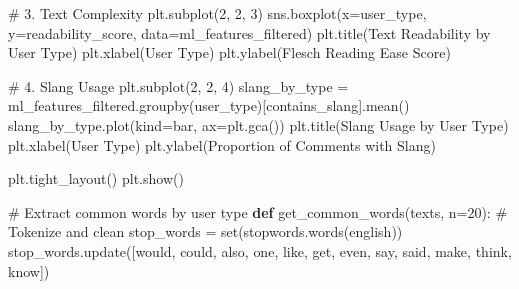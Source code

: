 \documentclass[
  12pt,
  letterpaper,
  DIV=11,
  numbers=noendperiod]{scrartcl}
\newenvironment{Shaded}{\begin{snugshade}}{\end{snugshade}}
\newcommand{\BuiltInTok}[1]{\textcolor[rgb]{0.00,0.23,0.31}{#1}}
\newcommand{\CommentTok}[1]{\textcolor[rgb]{0.37,0.37,0.37}{#1}}
\newcommand{\DecValTok}[1]{\textcolor[rgb]{0.68,0.00,0.00}{#1}}
\newcommand{\KeywordTok}[1]{\textcolor[rgb]{0.00,0.23,0.31}{\textbf{#1}}}
\newcommand{\NormalTok}[1]{\textcolor[rgb]{0.00,0.23,0.31}{#1}}
\newcommand{\OperatorTok}[1]{\textcolor[rgb]{0.37,0.37,0.37}{#1}}
\newcommand{\StringTok}[1]{\textcolor[rgb]{0.13,0.47,0.30}{#1}}
\begin{document}
\begin{Shaded}
\begin{Highlighting}[]
\CommentTok{\# 3. Text Complexity}
\NormalTok{plt.subplot(}\DecValTok{2}\NormalTok{, }\DecValTok{2}\NormalTok{, }\DecValTok{3}\NormalTok{)}
\NormalTok{sns.boxplot(x}\OperatorTok{=}\StringTok{\textquotesingle{}user\_type\textquotesingle{}}\NormalTok{, y}\OperatorTok{=}\StringTok{\textquotesingle{}readability\_score\textquotesingle{}}\NormalTok{, data}\OperatorTok{=}\NormalTok{ml\_features\_filtered)}
\NormalTok{plt.title(}\StringTok{\textquotesingle{}Text Readability by User Type\textquotesingle{}}\NormalTok{)}
\NormalTok{plt.xlabel(}\StringTok{\textquotesingle{}User Type\textquotesingle{}}\NormalTok{)}
\NormalTok{plt.ylabel(}\StringTok{\textquotesingle{}Flesch Reading Ease Score\textquotesingle{}}\NormalTok{)}

\CommentTok{\# 4. Slang Usage}
\NormalTok{plt.subplot(}\DecValTok{2}\NormalTok{, }\DecValTok{2}\NormalTok{, }\DecValTok{4}\NormalTok{)}
\NormalTok{slang\_by\_type }\OperatorTok{=}\NormalTok{ ml\_features\_filtered.groupby(}\StringTok{\textquotesingle{}user\_type\textquotesingle{}}\NormalTok{)[}\StringTok{\textquotesingle{}contains\_slang\textquotesingle{}}\NormalTok{].mean()}
\NormalTok{slang\_by\_type.plot(kind}\OperatorTok{=}\StringTok{\textquotesingle{}bar\textquotesingle{}}\NormalTok{, ax}\OperatorTok{=}\NormalTok{plt.gca())}
\NormalTok{plt.title(}\StringTok{\textquotesingle{}Slang Usage by User Type\textquotesingle{}}\NormalTok{)}
\NormalTok{plt.xlabel(}\StringTok{\textquotesingle{}User Type\textquotesingle{}}\NormalTok{)}
\NormalTok{plt.ylabel(}\StringTok{\textquotesingle{}Proportion of Comments with Slang\textquotesingle{}}\NormalTok{)}

\NormalTok{plt.tight\_layout()}
\NormalTok{plt.show()}

\CommentTok{\# Extract common words by user type}
\KeywordTok{def}\NormalTok{ get\_common\_words(texts, n}\OperatorTok{=}\DecValTok{20}\NormalTok{):}
    \CommentTok{\# Tokenize and clean}
\NormalTok{    stop\_words }\OperatorTok{=} \BuiltInTok{set}\NormalTok{(stopwords.words(}\StringTok{\textquotesingle{}english\textquotesingle{}}\NormalTok{))}
\NormalTok{    stop\_words.update([}\StringTok{\textquotesingle{}would\textquotesingle{}}\NormalTok{, }\StringTok{\textquotesingle{}could\textquotesingle{}}\NormalTok{, }\StringTok{\textquotesingle{}also\textquotesingle{}}\NormalTok{, }\StringTok{\textquotesingle{}one\textquotesingle{}}\NormalTok{, }\StringTok{\textquotesingle{}like\textquotesingle{}}\NormalTok{, }\StringTok{\textquotesingle{}get\textquotesingle{}}\NormalTok{, }\StringTok{\textquotesingle{}even\textquotesingle{}}\NormalTok{, }\StringTok{\textquotesingle{}say\textquotesingle{}}\NormalTok{, }\StringTok{\textquotesingle{}said\textquotesingle{}}\NormalTok{, }\StringTok{\textquotesingle{}make\textquotesingle{}}\NormalTok{, }\StringTok{\textquotesingle{}think\textquotesingle{}}\NormalTok{, }\StringTok{\textquotesingle{}know\textquotesingle{}}\NormalTok{])}
    

\end{Highlighting}
\end{Shaded}
\end{document}

